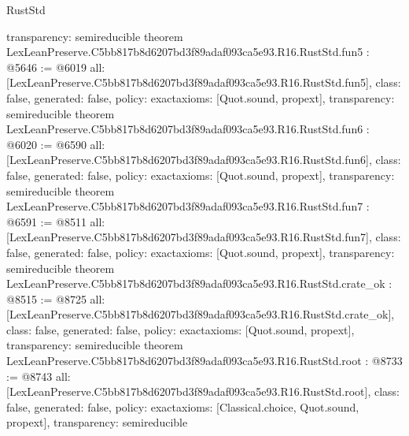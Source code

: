 \begin{lexlean}{RustStd}
\begin{coremodule}
{  transparency: semireducible
}
theorem LexLeanPreserve.C5bb817b8d6207bd3f89adaf093ca5e93.R16.RustStd.fun5 : @5646 := @6019 {
  all: [LexLeanPreserve.C5bb817b8d6207bd3f89adaf093ca5e93.R16.RustStd.fun5],
  class: false,
  generated: false,
  policy: exact{axioms: [Quot.sound, propext]},
  transparency: semireducible
}
theorem LexLeanPreserve.C5bb817b8d6207bd3f89adaf093ca5e93.R16.RustStd.fun6 : @6020 := @6590 {
  all: [LexLeanPreserve.C5bb817b8d6207bd3f89adaf093ca5e93.R16.RustStd.fun6],
  class: false,
  generated: false,
  policy: exact{axioms: [Quot.sound, propext]},
  transparency: semireducible
}
theorem LexLeanPreserve.C5bb817b8d6207bd3f89adaf093ca5e93.R16.RustStd.fun7 : @6591 := @8511 {
  all: [LexLeanPreserve.C5bb817b8d6207bd3f89adaf093ca5e93.R16.RustStd.fun7],
  class: false,
  generated: false,
  policy: exact{axioms: [Quot.sound, propext]},
  transparency: semireducible
}
theorem LexLeanPreserve.C5bb817b8d6207bd3f89adaf093ca5e93.R16.RustStd.crate_ok : @8515 := @8725 {
  all: [LexLeanPreserve.C5bb817b8d6207bd3f89adaf093ca5e93.R16.RustStd.crate_ok],
  class: false,
  generated: false,
  policy: exact{axioms: [Quot.sound, propext]},
  transparency: semireducible
}
theorem LexLeanPreserve.C5bb817b8d6207bd3f89adaf093ca5e93.R16.RustStd.root : @8733 := @8743 {
  all: [LexLeanPreserve.C5bb817b8d6207bd3f89adaf093ca5e93.R16.RustStd.root],
  class: false,
  generated: false,
  policy: exact{axioms: [Classical.choice, Quot.sound, propext]},
  transparency: semireducible
}


\end{coremodule}
\end{lexlean}
